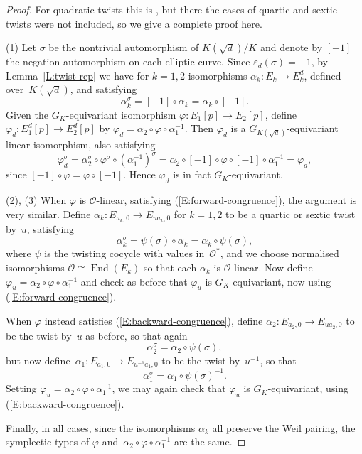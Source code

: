 \documentclass[12pt, reqno]{amsart}
\newcommand{\eps}{\varepsilon}
\newcommand{\calO}{\mathcal{O}}
\DeclareMathOperator{\End}{End}
\numberwithin{equation}{section}
\theoremstyle{definition}
\theoremstyle{remark}
\begin{document}
\begin{proof}
For quadratic twists this is \cite[Lemma~11]{FKSym}, but there the
cases of quartic and sextic twists were not included, so we give a
complete proof here.

(1) Let $\sigma$ be the nontrivial automorphism of $K(\sqrt{d})/K$ and
denote by $[-1]$ the negation automorphism on each elliptic curve.
Since $\eps_d(\sigma)=-1$, by Lemma~\ref{L:twist-rep} we have for
$k=1,2$ isomorphisms $\alpha_k:E_k\to E_k^d$, defined
over~$K(\sqrt{d})$, and satisfying
\[
\alpha_k^{\sigma} = [-1]\circ\alpha_k = \alpha_k\circ[-1].
\]
Given the $G_K$-equivariant isomorphism $\varphi:E_1[p]\to E_2[p]$,
define $\varphi_d:E_1^d[p]\to E_2^d[p]$ by
$\varphi_d=\alpha_2\circ\varphi\circ\alpha_1^{-1}$.  Then $\varphi_d$
is a $G_{K(\sqrt{d})}$-equivariant linear isomorphism, also satisfying
\[
\varphi_d^{\sigma} =
\alpha_2^{\sigma}\circ\varphi^{\sigma}\circ(\alpha_1^{-1})^{\sigma} =
\alpha_2\circ[-1]\circ\varphi\circ[-1]\circ\alpha_1^{-1} = \varphi_d,
\]
since $[-1]\circ\varphi=\varphi\circ[-1]$.  Hence $\varphi_d$ is
in fact $G_K$-equivariant.

(2), (3) When $\varphi$ is $\calO$-linear, satisfying
(\ref{E:forward-congruence}), the argument is very similar.  Define
$\alpha_k:E_{a_k,0}\to E_{ua_k,0}$ for $k=1,2$ to be a quartic or
sextic twist by~$u$, satisfying
\[
\alpha_k^{\sigma} = \psi(\sigma)\circ\alpha_k = \alpha_k\circ\psi(\sigma),
\]
where $\psi$ is the twisting cocycle with values in~$\calO^*$, and we
choose normalised isomorphisms $\calO\cong\End(E_k)$ so that each
$\alpha_k$ is $\calO$-linear.  Now define
$\varphi_u=\alpha_2\circ\varphi\circ\alpha_1^{-1}$ and check as before
that $\varphi_u$ is $G_K$-equivariant, now using
(\ref{E:forward-congruence}).

When $\varphi$ instead satisfies (\ref{E:backward-congruence}), define
$\alpha_2:E_{a_2,0}\to E_{ua_2,0}$ to be the twist by~$u$ as before,
so that again
\[
\alpha_2^{\sigma} = \alpha_2\circ\psi(\sigma),
\]
but now define~$\alpha_1:E_{a_1,0}\to E_{u^{-1}a_1,0}$ to be the twist
by~$u^{-1}$, so that
\[ \alpha_1^{\sigma} = \alpha_1\circ\psi(\sigma)^{-1}.
\]
Setting $\varphi_u=\alpha_2\circ\varphi\circ\alpha_1^{-1}$, we may
again check that $\varphi_u$ is $G_K$-equivariant, using
(\ref{E:backward-congruence}).

Finally, in all cases, since the isomorphisms $\alpha_k$ all preserve
the Weil pairing, the symplectic types of $\varphi$
and~$\alpha_2\circ\varphi\circ\alpha_1^{-1}$ are the same.
\end{proof}
\end{document}
